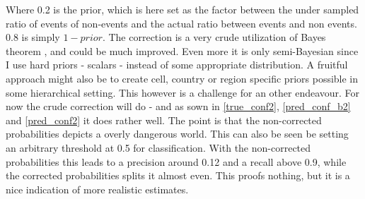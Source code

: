 \documentclass[a4paper]{article}
\begin{document}
Where 0.2 is the prior, which is here set as the factor between the under sampled ratio of events of non-events and the actual ratio between events and non events. 0.8 is simply $1-prior$. The correction is a very crude utilization of Bayes theorem \citep[7-8]{Gelman_2013}, and could be much improved. Even more it is only semi-Bayesian since I use hard priors - scalars - instead of some appropriate distribution. A fruitful approach might also be to create cell, country or region specific priors possible in some hierarchical setting. This however is a challenge for an other endeavour. For now the crude correction will do - and as sown in \autoref{true_conf2}, \autoref{pred_conf_b2} and \autoref{pred_conf2} it does rather well. The point is that the non-corrected probabilities depicts a overly dangerous world. This can also be seen be setting an arbitrary threshold at 0.5 for classification. With the non-corrected probabilities this leads to a precision around 0.12 and a recall above 0.9, while the corrected probabilities splits it almost even. This proofs nothing, but it is a nice indication of more realistic estimates.\par
\end{document}
